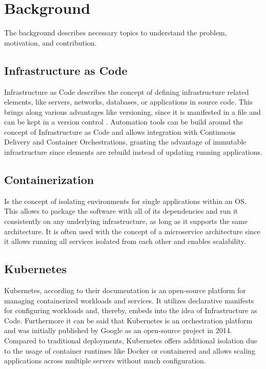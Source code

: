 \chapter{Background}
The background describes necessary topics to understand the problem, motivation, and contribution.

\section{Infrastructure as Code}
Infrastructure as Code describes the concept of defining infrastructure related elements, like servers, networks, databases, or applications in source code. This brings along various advantages like versioning, since it is manifested in a file and can be kept in a version control . Automation tools can be build around the concept of Infrastructure as Code and allows integration with Continuous Delivery and Container Orchestrations, granting the advantage of immutable infrastructure since elements are rebuild instead of updating running applications.
\section{Containerization}
Is the concept of isolating environments for single applications within an OS. This allows to package the software with all of its dependencies and run it consistently on any underlying infrastructure, as long as it supports the same architecture. It is often used with the concept of a microservice architecture since it allows running all services isolated from each other and enables scalability.

\section{Kubernetes}
Kubernetes, according to their documentation is an open-source platform for managing containerized workloads and services. It utilizes declarative manifests for configuring workloads and, thereby, embeds into the idea of Infrastructure as Code. Furthermore it can be said that Kubernetes is an orchestration platform and was initially published by Google as an open-source project in 2014. Compared to traditional deployments, Kubernetes offers additional isolation due to the usage of container runtimes like Docker or containered and allows scaling applications across multiple servers without much configuration.

